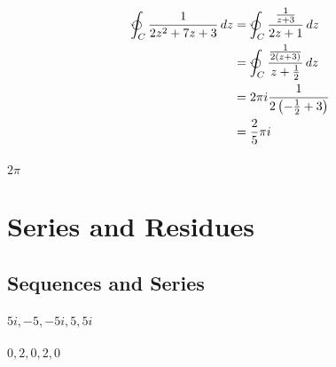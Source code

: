 \documentclass{article}
\begin{document}
\setcounter{subsubsection}{24}
\subsubsection{}

\begin{align*}
  \varointctrclockwise_C \frac{1}{2 z^2 + 7 z + 3} \,d z & = \varointctrclockwise_C \frac{\frac{1}{z + 3}}{2 z + 1} \,d z             \\
                                                         & = \varointctrclockwise_C \frac{\frac{1}{2 (z + 3)}}{z + \frac{1}{2}} \,d z \\
                                                         & = 2 \pi i \frac{1}{2 \left( -\frac{1}{2} + 3 \right)}                      \\
                                                         & = \frac{2}{5} \pi i
\end{align*}

\setcounter{subsubsection}{26}
\subsubsection{}

$2 \pi$

\section{Series and Residues}

\subsection{Sequences and Series}

\subsubsection{}

$5 i, -5, -5 i, 5, 5 i$

\setcounter{subsubsection}{2}
\subsubsection{}

$0, 2, 0, 2, 0$

\setcounter{subsubsection}{4}
\subsubsection{}
\end{document}
